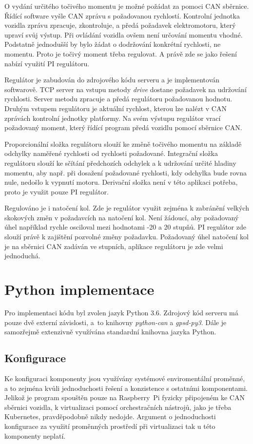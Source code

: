 \documentclass[czech, bachelor]{diploma}
\begin{document}
O vydání určitého točivého momentu je možné požádat za pomoci CAN sběrnice. Řídící software vyšle CAN zprávu s požadovanou
rychlostí. Kontrolní jednotka vozidla zprávu zpracuje, zkontroluje, a předá požadavek elektromotoru, který upraví svůj výstup.
Při ovládání vozidla ovšem není určování momentu vhodné. Podstatně jednodušší by bylo žádat o dodržování konkrétní rychlosti,
ne momentu. Proto je točivý moment třeba regulovat. A právě zde se jako řešení nabízí využití PI regulátoru\cite{
pid-controller-source}.

Regulátor je zabudován do zdrojového kódu serveru a je implementován softwarově. TCP server na vstupu metody \emph{drive} dostane
požadavek na udržování rychlosti. Server metodu zpracuje a předá regulátoru požadovanou hodnotu. Druhým vstupem regulátoru
je aktuální rychlost, kterou lze nalézt v CAN zprávách kontrolní jednotky platformy. Na svém výstupu regulátor vrací požadovaný
moment, který řídící program předá vozidlu pomocí sběrnice CAN.

Proporcionální složka regulátoru slouží ke změně točivého momentu na základě odchylky naměřené rychlosti od rychlosti požadované.
Integrační složka regulátoru slouží ke sčítání předchozích odchylek a k udržování určité hladiny momentu, aby např. při dosažení
požadované rychlosti, kdy odchylka bude rovna nule, nedošlo k vypnutí motoru. Derivační složka není v této aplikaci potřeba, proto
je využit pouze PI regulátor.

Regulováno je i natočení kol. Zde je regulátor využit zejména k zabránění velkých skokových změn v požadavcích na natočení kol.
Není žádoucí, aby požadovaný úhel například rychle osciloval mezi hodnotami -20 a 20 stupňů. PI regulátor zde slouží právě
k zajištění pozvolné změny požadavku. Požadovaný úhel natočení kol je na sběrnici CAN zadáván ve stupních, aplikace regulátoru je
zde velmi jednoduchá.

\section{Python implementace}

Pro implementaci kódu byl zvolen jazyk Python 3.6. Zdrojový kód serveru má pouze dvě externí závislosti, a~to knihovny
\emph{python-can} a\cite{python-can-source} \emph{gpsd-py3}\cite{gpsd-py3-source}. Dále je samozřejmě extenzivně využívána
standardní knihovna jazyka Python.

\subsection{Konfigurace}
Ke konfiguraci komponenty jsou využívány systémové enviromentální proměnné, a to zejména kvůli jednoduchosti řešení a konzistence
s ostatními komponentami. Jelikož je program spouštěn pouze na Raspberry~Pi fyzicky připojeném ke CAN sběrnici vozidla,
k virtualizaci pomocí orchestračních nástrojů, jako je třeba Kubernetes, pravděpodobně nikdy nedojde. Argument o jednoduchosti
konfigurace za využití proměnných prostředí při virtualizaci tak u této komponenty neplatí.
\end{document}
